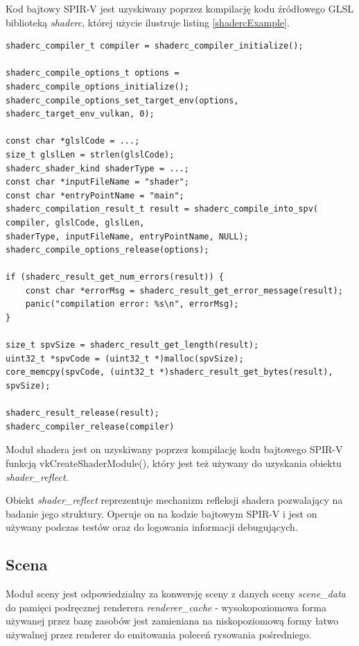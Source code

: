Kod bajtowy SPIR-V jest uzyskiwany poprzez kompilację kodu źródłowego GLSL biblioteką \textit{shaderc}, której użycie ilustruje listing \ref{shadercExample}.
\lstset{language=C}
\begin{lstlisting}[caption={Kompilacja kodu źródłowego GLSL biblioteką \textit{shaderc}},captionpos=b,label={shadercExample}]
shaderc_compiler_t compiler = shaderc_compiler_initialize();

shaderc_compile_options_t options = shaderc_compile_options_initialize();
shaderc_compile_options_set_target_env(options, shaderc_target_env_vulkan, 0);

const char *glslCode = ...;
size_t glslLen = strlen(glslCode);
shaderc_shader_kind shaderType = ...;
const char *inputFileName = "shader";
const char *entryPointName = "main";
shaderc_compilation_result_t result = shaderc_compile_into_spv(
compiler, glslCode, glslLen,
shaderType, inputFileName, entryPointName, NULL);
shaderc_compile_options_release(options);

if (shaderc_result_get_num_errors(result)) {
	const char *errorMsg = shaderc_result_get_error_message(result);
	panic("compilation error: %s\n", errorMsg);
}

size_t spvSize = shaderc_result_get_length(result);
uint32_t *spvCode = (uint32_t *)malloc(spvSize);
core_memcpy(spvCode, (uint32_t *)shaderc_result_get_bytes(result), spvSize);

shaderc_result_release(result);
shaderc_compiler_release(compiler)
\end{lstlisting}

Moduł shadera jest on uzyskiwany poprzez kompilację kodu bajtowego SPIR-V funkcją vkCreateShaderModule(), który jest też używany do uzyskania obiektu \textit{shader\_reflect}.

Obiekt \textit{shader\_reflect} reprezentuje mechanizm refleksji shadera pozwalający na badanie jego struktury.
Operuje on na kodzie bajtowym SPIR-V i jest on używany podczas testów oraz do logowania informacji debugujących.


\subsection{Scena}

Moduł sceny jest odpowiedzialny za konwersję sceny z danych sceny \textit{scene\_data} do pamięci podręcznej renderera \textit{renderer\_cache} - wysokopoziomowa forma używanej przez bazę zasobów jest zamieniana na niskopoziomową formy łatwo używalnej przez renderer do emitowania poleceń rysowania pośredniego.

